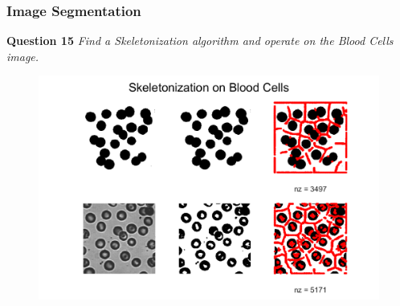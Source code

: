 \newpage
\subsubsection{Image Segmentation}
\textbf{Question 15} \textit{Find a Skeletonization algorithm and operate on the Blood Cells image.}


\begin{figure}[H]
    \centering
    \includegraphics[width=\linewidth]{Doc/Graphics/Part2/part2_Q15.png}
\end{figure}
